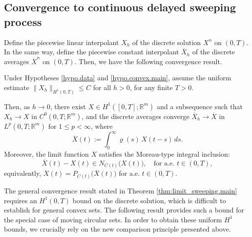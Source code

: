 \documentclass[]{jnsao}
\renewcommand{\tr}{R}
\begin{document}

\subsection{Convergence to continuous delayed sweeping process}
Define the piecewise linear interpolant $X_h$ of the discrete solution $X^n$ on $(0,T)$.
In the same way, define the piecewise constant interpolant $\overline{X}_h$ of the discrete averages $\overline{X}^n$ on $(0,T)$.
Then, we have the following convergence result. 
\begin{theorem}\label{thm:limit_sweeping.main}
	Under Hypotheses \ref{hypo.data} and \ref{hypo.convex.main}, assume the uniform estimate
	$ \| X_h \|_{H^1(0,T)}\le C$ for all $h>0$, for any finite $T>0$.
	
	Then, as $h\to0$, there exist $X\in H^1([0,T];\mathbb R^m)$ and a subsequence such that 
	$X_h \to X$ in $C^0 (0,T;\mathbb R^m)$, and the discrete averages converge 
	$\overline{X}_h \to \overline{X}$ in $L^p(0,T;\mathbb R^m)$ for $1\le p<\infty$, where
	\[
	\overline{X}(t) := \int_0^\infty \varrho(s)\,X(t-s)\,ds.
	\]
	Moreover, the limit function $X$ satisfies the Moreau-type integral inclusion:
	\begin{equation}\label{eq:limit_inclusion.main}
		\overline{X}(t)-X(t)\in N_{C(t)}\big(X(t)\big), \quad\text{for a.e. }t\in(0,T),
	\end{equation}
	equivalently, $X(t)=P_{C(t)}\big(\overline{X}(t)\big)$ for a.e. $t\in(0,T)$.
\end{theorem}

\begin{remark}
	The general convergence result stated in Theorem \ref{thm:limit_sweeping.main} 
	requires an $H^1(0,T)$ bound on the discrete solution, which is difficult to 
	establish for general convex sets. The following result provides such a bound 
	for the special case of moving circular sets. In order to obtain these 
	uniform $H^1$ bounds, we crucially rely on the new comparison principle
	presented above.
\end{remark}
\end{document}
